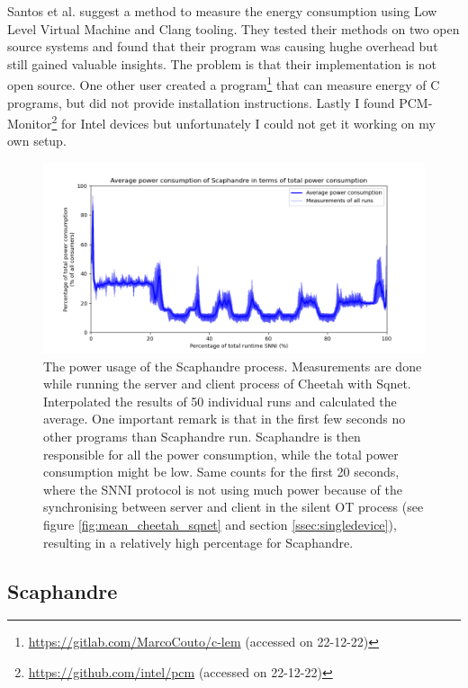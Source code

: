 \documentclass[../thesis.tex]{subfiles}
\begin{document}
Santos et al. \parencite*{santos2017} suggest a method to measure the energy consumption using Low Level Virtual Machine and Clang tooling. They tested their methods on two open source systems and found that their program was causing hughe overhead but still gained valuable insights. The problem is that their implementation is not open source. One other user created a program\footnote{\url{https://gitlab.com/MarcoCouto/c-lem} (accessed on 22-12-22)} that can measure energy of C programs, but did not provide installation instructions. Lastly I found PCM-Monitor\footnote{\url{https://github.com/intel/pcm} (accessed on 22-12-22)} for Intel devices but unfortunately I could not get it working on my own setup. 
\begin{figure}[t]
    \centering
    \includegraphics[width=\linewidth]{Thesis/Images/overhead_scaphandre.png}
    \caption{The power usage of the Scaphandre process. Measurements are done while running the server and client process of Cheetah with Sqnet. Interpolated the results of 50 individual runs and calculated the average. One important remark is that in the first few seconds no other programs than Scaphandre run. Scaphandre is then responsible for all the power consumption, while the total power consumption might be low.  Same counts for the first 20 seconds, where the SNNI protocol is not using much power because of the synchronising between server and client in the silent OT process (see figure \ref{fig:mean_cheetah_sqnet} and section \ref{ssec:singledevice}), resulting in a relatively high percentage for Scaphandre.}
    \label{fig:overhead_scaphandre}
\end{figure}
\subsection{Scaphandre}
\end{document}
